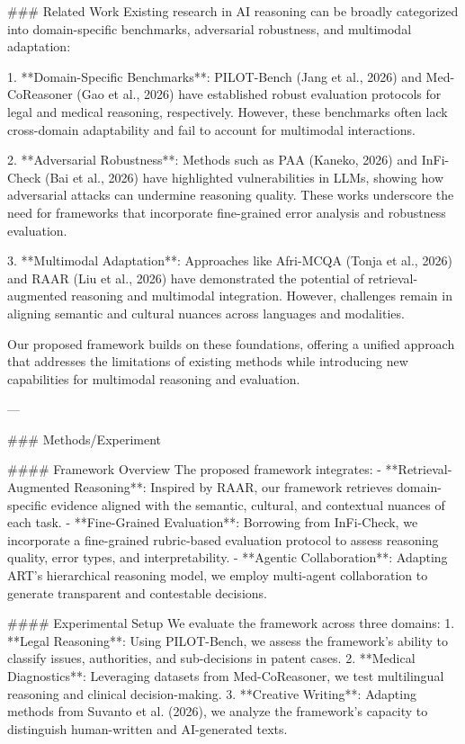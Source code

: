 ### Related Work
Existing research in AI reasoning can be broadly categorized into domain-specific benchmarks, adversarial robustness, and multimodal adaptation:

1. **Domain-Specific Benchmarks**: PILOT-Bench (Jang et al., 2026) and Med-CoReasoner (Gao et al., 2026) have established robust evaluation protocols for legal and medical reasoning, respectively. However, these benchmarks often lack cross-domain adaptability and fail to account for multimodal interactions.

2. **Adversarial Robustness**: Methods such as PAA (Kaneko, 2026) and InFi-Check (Bai et al., 2026) have highlighted vulnerabilities in LLMs, showing how adversarial attacks can undermine reasoning quality. These works underscore the need for frameworks that incorporate fine-grained error analysis and robustness evaluation.

3. **Multimodal Adaptation**: Approaches like Afri-MCQA (Tonja et al., 2026) and RAAR (Liu et al., 2026) have demonstrated the potential of retrieval-augmented reasoning and multimodal integration. However, challenges remain in aligning semantic and cultural nuances across languages and modalities.

Our proposed framework builds on these foundations, offering a unified approach that addresses the limitations of existing methods while introducing new capabilities for multimodal reasoning and evaluation.

---

### Methods/Experiment

#### Framework Overview
The proposed framework integrates:
- **Retrieval-Augmented Reasoning**: Inspired by RAAR, our framework retrieves domain-specific evidence aligned with the semantic, cultural, and contextual nuances of each task.
- **Fine-Grained Evaluation**: Borrowing from InFi-Check, we incorporate a fine-grained rubric-based evaluation protocol to assess reasoning quality, error types, and interpretability.
- **Agentic Collaboration**: Adapting ART's hierarchical reasoning model, we employ multi-agent collaboration to generate transparent and contestable decisions.

#### Experimental Setup
We evaluate the framework across three domains:
1. **Legal Reasoning**: Using PILOT-Bench, we assess the framework's ability to classify issues, authorities, and sub-decisions in patent cases.
2. **Medical Diagnostics**: Leveraging datasets from Med-CoReasoner, we test multilingual reasoning and clinical decision-making.
3. **Creative Writing**: Adapting methods from Suvanto et al. (2026), we analyze the framework's capacity to distinguish human-written and AI-generated texts.

